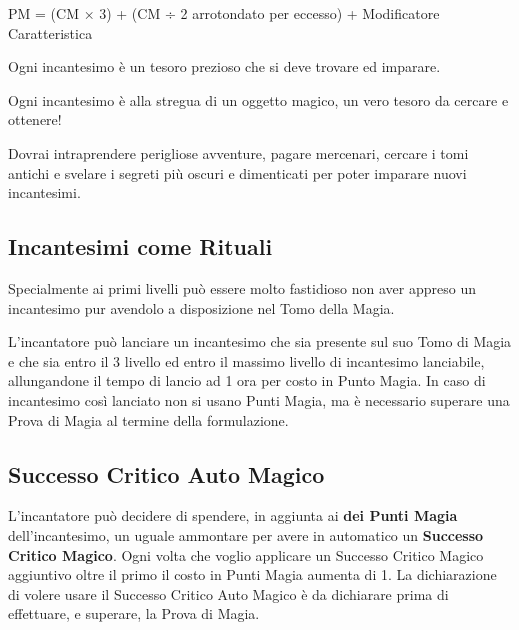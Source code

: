 \begin{multicols}{2}
PM = (CM × 3) + (CM ÷ 2 arrotondato per eccesso) + Modificatore Caratteristica


\begin{giocatore}
	Ogni incantesimo è un tesoro prezioso che si deve trovare ed imparare.

	Ogni incantesimo è alla stregua di un oggetto magico, un vero tesoro da cercare e ottenere!

	Dovrai intraprendere perigliose avventure, pagare mercenari, cercare i tomi antichi e svelare i segreti più oscuri e dimenticati per poter imparare nuovi incantesimi.
\end{giocatore}


\subsection*{Incantesimi come Rituali}

Specialmente ai primi livelli può essere molto fastidioso non aver appreso un incantesimo pur avendolo a disposizione nel Tomo della Magia.

L'incantatore può lanciare un incantesimo che sia presente sul suo Tomo di Magia e che sia entro il 3 livello ed entro il massimo livello di incantesimo lanciabile, allungandone il tempo di lancio ad 1 ora per costo in Punto Magia. In caso di incantesimo così lanciato non si usano Punti Magia, ma è necessario superare una Prova di Magia al termine della formulazione.


\subsection{Successo Critico Auto Magico}\label{magienova}

L'incantatore può decidere di spendere, in aggiunta ai \textbf{dei Punti Magia} dell'incantesimo, un uguale ammontare per avere in automatico un \textbf{Successo Critico Magico}.
Ogni volta che voglio applicare un Successo Critico Magico aggiuntivo oltre il primo il costo in Punti Magia aumenta di 1. La dichiarazione di volere usare il Successo Critico Auto Magico è da dichiarare prima di effettuare, e superare, la Prova di Magia.



%


\end{multicols}
